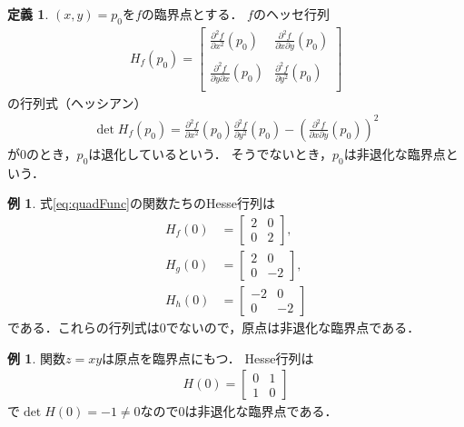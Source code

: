 \documentclass[11pt, a4paper, dvipdfmx]{jsarticle}
\theoremstyle{definition}
\newcommand{\p}{\partial}
\newcommand{\dip}{\displaystyle} %
\theoremstyle{mystyle}
\newtheorem{DFN}[Axiom]{定義}
\newtheorem{EG}[Axiom]{例}
\numberwithin{equation}{section} %
\begin{document}
\begin{DFN}
    $(x,y)=p_0$を$f$の臨界点とする．
    $f$のヘッセ行列
    \begin{align}
        H_f(p_0)=
        \begin{bmatrix*}
            \dip \frac{\p^2 f}{\p x^2}(p_0)   &\dip\frac{\p^2 f}{\p x\p y}(p_0)\\\\
            \dip \frac{\p^2 f}{\p y\p x}(p_0) &\dip \frac{\p^2 f}{\p y^2}(p_0)\\
        \end{bmatrix*}
    \end{align}
    の行列式（ヘッシアン）
    \begin{align}
        \det H_f(p_0) = \frac{\p^2 f}{\p x^2}(p_0)\dip \frac{\p^2 f}{\p y^2}(p_0)
        -\left(\frac{\p^2 f}{\p x\p y}(p_0)\right)^2 \label{eq:hessian}
    \end{align}
    が0のとき，$p_0$は退化しているという．
    そうでないとき，$p_0$は非退化な臨界点という．
\end{DFN}

\begin{EG}
    式\eqref{eq:quadFunc}の関数たちのHesse行列は
    \begin{align*}
        H_f(0)&=
        \begin{bmatrix*}
            \dip 2&0\\
            \dip 0&2
        \end{bmatrix*},\\
        H_g(0)&=
        \begin{bmatrix*}
            \dip 2 & 0\\
            \dip 0 &-2
        \end{bmatrix*},\\
        H_h(0)&=
        \begin{bmatrix*}
            \dip -2& 0\\
            \dip 0 &-2
        \end{bmatrix*}
    \end{align*}
    である．これらの行列式は0でないので，原点は非退化な臨界点である．
\end{EG}

\begin{EG}
    関数$z=xy$は原点を臨界点にもつ．
    Hesse行列は
    \begin{align*}
        H(0)=\begin{bmatrix*}
            0&1\\
            1&0
        \end{bmatrix*}
    \end{align*}
    で$\det H(0)=-1\neq0$なので0は非退化な臨界点である．
\end{EG}
\end{document}
